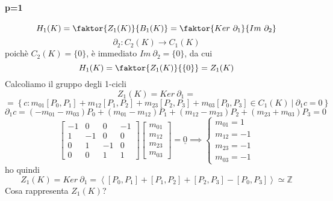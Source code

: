 \documentclass[a4paper]{report}
\newcommand{\Z}{\ensuremath{\mathbb{Z}}}
\newcommand{\ra}{\ensuremath{\rightarrow}}
\newcommand{\setst}[2]{\ensuremath{\left\{{#1}\ |\ {#2}\right\}}}
\newcommand{\gen}[1]{\ensuremath{\left<{#1}\right>}}
\begin{document}
\paragraph{p=1}
\[
    H_1(K)=\faktor{Z_1(K)}{B_1(K)}=\faktor{Ker\ \partial_1}{Im\ \partial_2}
\]
\[
    \partial_2:C_2(K)\ra C_1(K)
\]
poichè $C_2(K)=\{0\}$, è immediato $Im\ \partial_2=\{0\}$, da cui
\[
    H_1(K)=\faktor{Z_1(K)}{\{0\}}=Z_1(K)
\]
Calcoliamo il gruppo degli 1-cicli
\[
    Z_1(K)=Ker\ \partial_1=
\]
\[
    =\setst{c:m_{01}[P_0,P_1]+m_{12}[P_1,P_2]+m_{23}[P_2,P_3]+m_{03}[P_0,P_3]\in C_1(K)}{\partial_1 c=0}
\]
\[
    \partial_1 c=(-m_{01}-m_{03})P_0+(m_{01}-m_{12})P_1+(m_{12}-m_{23})P_2+(m_{23}+m_{03})P_3=0
\]
\[
    \left[\begin{array}{rrrr}
            -1 & 0  & 0  & -1 \\
            1  & -1 & 0  & 0  \\
            0  & 1  & -1 & 0  \\
            0  & 0  & 1  & 1
        \end{array}\right]
    \left[\begin{array}{r}
            m_{01} \\
            m_{12} \\
            m_{23} \\
            m_{03}
        \end{array}\right]=\underline{0}\implies\begin{cases}
        m_{01}=1  \\
        m_{12}=-1 \\
        m_{23}=-1 \\
        m_{03}=-1
    \end{cases}
\]
ho quindi
\[
    Z_1(K)=Ker\ \partial_1=\gen{[P_0,P_1]+[P_1,P_2]+[P_2,P_3]-[P_0,P_3]}\simeq\Z
\]
Cosa rappresenta $Z_1(K)$?
\end{document}
